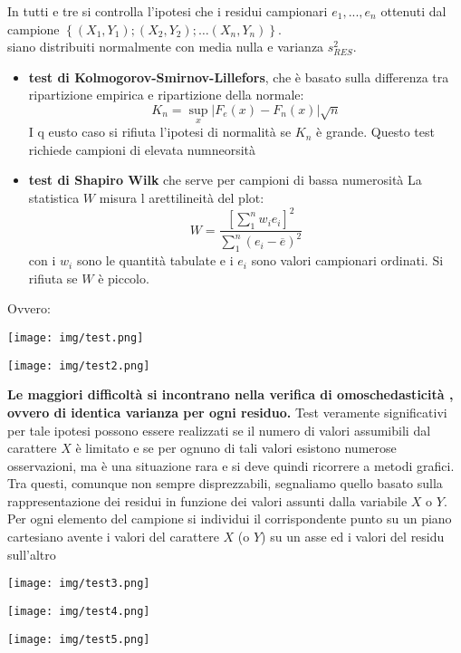 \documentclass[a4paper,12pt, oneside]{book}
\begin{document}
In tutti e tre si controlla l'ipotesi che i residui campionari $e_1,...,e_n$ ottenuti dal campione
$\left\{\left(X_{1}, Y_{1}\right) ;\left(X_{2}, Y_{2}\right) ; \ldots\left(X_{n}, Y_{n}\right)\right\}$.\\
siano distribuiti normalmente con media nulla e varianza $s_{RES}^2$.
\begin{itemize}
\item \textbf{test di Kolmogorov-Smirnov-Lillefors}, che è basato sulla differenza tra ripartizione empirica e ripartizione della normale:
  \[K_{n}=\sup_{x}\left|F_{e}(x)-F_{n}(x)\right| \sqrt{n}\]
  I q eusto caso si rifiuta l'ipotesi di normalità se $K_n$ è grande. Questo test richiede campioni di elevata numneorsità
\item \textbf{test di Shapiro Wilk} che serve per campioni di bassa numerosità La statistica $W$ misura l arettilineità del plot:
  \[W=\frac{\left[\sum_{1}^{n} w_{i} e_{i}\right]^{2}}{\sum_{1}^{n}\left(e_{i}-\overline{e}\right)^{2}}\]
  con i $w_i$ sono le quantità tabulate e i $e_i$ sono valori campionari ordinati. Si rifiuta se $W$ è piccolo.
\end{itemize}
\newpage
Ovvero:
\begin{center}
\texttt{[image: img/test.png]}
\end{center}
\begin{center}
\texttt{[image: img/test2.png]}
\end{center}
\textbf{Le maggiori difficoltà si incontrano nella verifica di omoschedasticità , ovvero di
identica varianza per ogni residuo.} Test veramente significativi per tale ipotesi possono essere realizzati se il numero di
valori assumibili dal carattere $X$ è limitato e se per ognuno di tali valori esistono
numerose osservazioni, ma è una situazione rara e si deve quindi ricorrere a metodi grafici.\\
Tra questi, comunque non sempre disprezzabili, segnaliamo quello basato sulla
rappresentazione dei residui in funzione dei valori assunti dalla variabile $X$ o $Y$.
Per ogni elemento del campione si individui il corrispondente punto su un piano
cartesiano avente i valori del carattere $X$ (o $Y$) su un asse ed i valori del residu
sull'altro
\begin{center}
\texttt{[image: img/test3.png]}
\end{center}
\begin{center}
\texttt{[image: img/test4.png]}
\end{center}
\begin{center}
\texttt{[image: img/test5.png]}
\end{center}
\end{document}
